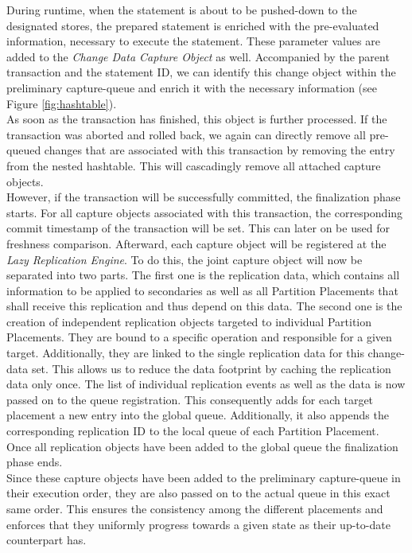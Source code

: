 During runtime, when the statement is about to be pushed-down to the designated stores, the prepared statement is enriched with the pre-evaluated information, 
necessary to execute the statement. These parameter values are added to the \emph{Change Data Capture Object} as well. 
Accompanied by the parent transaction and the statement ID, we can identify this change object within the preliminary capture-queue 
and enrich it with the necessary information (see Figure \ref{fig:hashtable}).\\
As soon as the transaction has finished, this object is further processed. If the transaction was aborted and rolled back, we again can directly remove all pre-queued changes 
that are associated with this transaction by removing the entry from the nested hashtable. This will cascadingly remove all attached capture objects.\\
However, if the transaction will be successfully committed, the finalization phase starts. For all capture objects associated with this transaction, the corresponding commit 
timestamp of the transaction will be set. This can later on be used for freshness comparison. Afterward, each capture object will be registered at the \emph{Lazy Replication Engine}. 
To do this, the joint capture object will now be separated into two parts. The first one is the replication data, which contains all information to be applied to 
secondaries as well as all Partition Placements that shall receive this replication and thus depend on this data. The second one is the creation of independent replication 
objects targeted to individual Partition Placements. They are bound to a specific operation and responsible for a given target. Additionally, they are linked to the single replication data for this change-data set.
This allows us to reduce the data footprint by caching the replication data only once. The list of individual replication events as well as the data is now passed on to the
queue registration. This consequently adds for each target placement a new entry into the global queue. Additionally, it also appends the corresponding replication ID to 
the local queue of each Partition Placement. Once all replication objects have been added to the global queue the finalization phase ends.\\
Since these capture objects have been added to the preliminary capture-queue in their execution order, they are also passed on to the actual queue in this exact same order.
This ensures the consistency among the different placements and enforces that they uniformly progress towards a given state as their up-to-date counterpart has.

